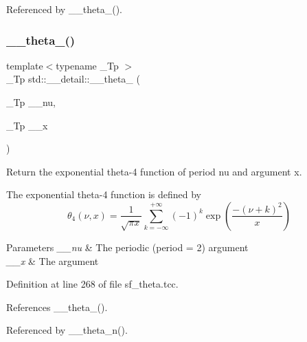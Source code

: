 Referenced by \+\_\+\+\_\+theta\+\_().

\mbox{\label{namespacestd_1_1____detail_a274d3801b84bcaad13c274c8bab32bcc}} 
\subsubsection{\texorpdfstring{\+\_\+\+\_\+theta\+\_()}{\_\_theta\_4()}}
{\footnotesize\ttfamily template$<$typename \+\_\+\+Tp $>$ \\
\+\_\+\+Tp std\+::\+\_\+\+\_\+detail\+::\+\_\+\+\_\+theta\+\_ (\begin{DoxyParamCaption}\item[{\+\_\+\+Tp}]{\+\_\+\+\_\+nu,  }\item[{\+\_\+\+Tp}]{\+\_\+\+\_\+x }\end{DoxyParamCaption})}

Return the exponential theta-\/4 function of period {\ttfamily nu} and argument {\ttfamily x}.

The exponential theta-\/4 function is defined by \[ \theta_4(\nu,x) = \frac{1}{\sqrt{\pi x}} \sum_{k=-\infty}^{+\infty} (-1)^k \exp\left( \frac{-(\nu + k)^2}{x} \right) \]


\begin{DoxyParams}{Parameters}
{\em \+\_\+\+\_\+nu} & The periodic (period = 2) argument \\
\hline
{\em \+\_\+\+\_\+x} & The argument \\
\hline
\end{DoxyParams}


Definition at line 268 of file sf\+\_\+theta.\+tcc.



References \+\_\+\+\_\+theta\+\_().



Referenced by \+\_\+\+\_\+theta\+\_\+n().

\mbox{\label{namespacestd_1_1____detail_af95cdf16bfcf6c138d621b0c518a3299}} 
